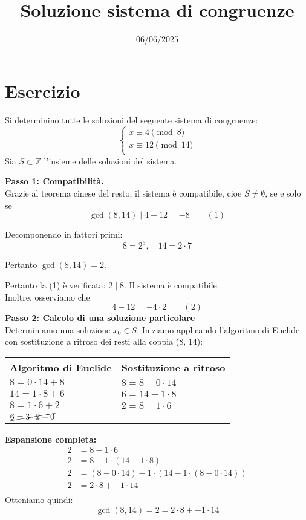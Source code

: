 \documentclass[12pt]{article}
\begin{document}
\title{Soluzione sistema di congruenze}
\date{06/06/2025}
\maketitle
\section*{Esercizio}
Si determinino tutte le soluzioni del seguente sistema di congruenze:
\[
\begin{cases}
x \equiv 4 \pmod{8} \\
x \equiv 12 \pmod{14} \\
\end{cases}
\]
Sia $S \subset \mathbb{Z}$ l'insieme delle soluzioni del sistema.

\textbf{Passo 1: Compatibilità.} \\ 
Grazie al teorema cinese del resto, il sistema è compatibile, cioe $S \neq \emptyset$, se e solo se
$$\gcd(8, 14) \mid 4 - 12 = -8 \qquad (1)$$

Decomponendo in fattori primi:
$$8 = 2^{3}, \quad 14 = 2 \cdot 7$$

Pertanto $\gcd(8, 14) = 2$.

Pertanto la (1) è verificata: $2 \mid 8$. Il sistema è compatibile.\\
Inoltre, osserviamo che $$4 - 12 = -4 \cdot 2 \qquad (2)$$
\textbf{Passo 2: Calcolo di una soluzione particolare} \\
Determiniamo una soluzione $x_0 \in S$.
Iniziamo applicando l'algoritmo di Euclide con sostituzione a ritroso dei resti alla coppia (8, 14):
\begin{center}
\setlength{\arrayrulewidth}{0.5pt}
\begin{tabular}{|p{5cm}|p{9cm}|}
\hline
\textbf{Algoritmo di Euclide} & \textbf{Sostituzione a ritroso} \\
\hline
$8 = 0 \cdot  14 + 8$ & $8 = 8 - 0 \cdot  14$ \\
\hline
$14 = 1 \cdot  8 + 6$ & $6 = 14 - 1 \cdot  8$ \\
\hline
$8 = 1 \cdot  6 + 2$ & $2 = 8 - 1 \cdot  6$ \\
\hline
$\cancel{6 = 3 \cdot  2 + 0}$ & \\
\hline
\end{tabular}
\end{center}
\textbf{Espansione completa:}
\begin{align*}
2 &= 8 - 1\cdot6\\
2 &= 8 - 1\cdot(14 - 1\cdot8)\\
2 &= (8 - 0\cdot14) - 1\cdot(14 - 1\cdot(8 - 0\cdot14))\\
2 &= 2\cdot8 + -1\cdot14\\
\end{align*}
Otteniamo quindi: $$\gcd(8, 14) = 2 = 2 \cdot 8 + -1 \cdot 14$$
\end{document}
